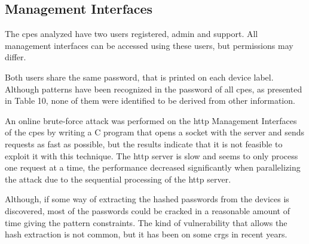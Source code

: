 \subsection{Management Interfaces}

The \glspl{cpe} analyzed have two users registered, admin and support. All management interfaces can be accessed using these users, but permissions may differ.

Both users share the same password, that is printed on each device label. Although patterns have been recognized in the password of all \gls{cpe}s, as presented in Table 10, none of them were identified to be derived from other information.

\begin{table}[h]
    \caption{Management Interface Password Pattern of the \gls{cpe}s}
    \label{table:cpes_mgtiface_pattern}
\end{table}

An online brute-force attack was performed on the \gls{http} Management Interfaces of the \glspl{cpe} by writing a C program that opens a socket with the server and sends requests as fast as possible, but the results indicate that it is not feasible to exploit it with this technique. The \gls{http} server is slow and seems to only process one request at a time, the performance decreased significantly when parallelizing the attack due to the sequential processing of the \gls{http} server.

Although, if some way of extracting the hashed passwords from the devices is discovered, most of the passwords could be cracked in a reasonable amount of time giving the pattern constraints. The kind of vulnerability that allows the hash extraction is not common, but it has been on some \glspl{crg} in recent years.

\FloatBarrier
